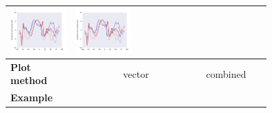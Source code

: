 \documentclass[
11pt, %
english, %
singlespacing, %
headsepline, %
]{MastersDoctoralThesis} %
\begin{document}
\begin{NoHyper}
\begin{refsection}
\begin{subappendices}
\begin{tabular}[c]{l|p{0.25\linewidth}|p{0.25\linewidth}|p{0.25\linewidth}|}
				\includegraphics[width=\linewidth, page=5]{psyplot-figures/psy-simple-demo.pdf} &
				\includegraphics[width=\linewidth, page=6]{psyplot-figures/psy-simple-demo.pdf} \\
			\midrule
			\midrule
			\textbf{Plot method} & \multicolumn{2}{c|}{vector} & combined \\
			\hline
			\textbf{Example} &

\end{tabular}
\end{subappendices}
\end{refsection}
\end{NoHyper}
\end{document}
